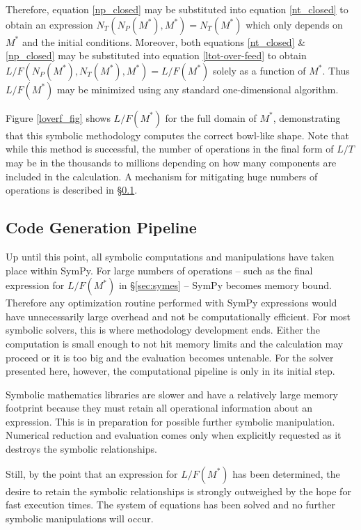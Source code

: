 \documentclass[preprint,12pt]{elsarticle}
\begin{document}
Therefore, equation \ref{np_closed} may be substituted into equation \ref{nt_closed}
to obtain an expression $N_T(N_P(M^*),M^*)=N_T(M^*)$ which only depends on $M^*$ and 
the initial conditions.  Moreover, both equations \ref{nt_closed} \& \ref{np_closed}
may be substituted into equation \ref{ltot-over-feed} to obtain 
$L/F(N_P(M^*),N_T(M^*),M^*)=L/F(M^*)$ solely as a function of $M^*$.  Thus
$L/F(M^*)$ may be minimized using any standard one-dimensional algorithm.

Figure \ref{loverf_fig} shows $L/F(M^*)$ for the full domain of $M^*$, demonstrating 
that this symbolic methodology computes the correct bowl-like shape.  Note that while 
this method is successful, the number of operations in the final form of $L/T$ may be 
in the thousands to millions depending on how many components are included in the 
calculation.  A mechanism for mitigating huge numbers of operations is described
in \S \ref{sec:codegen}.


\subsection{Code Generation Pipeline}
\label{sec:codegen}

Up until this point, all symbolic computations and manipulations have taken place
within SymPy.  For large numbers of operations -- such as the final expression for
$L/F(M^*)$ in \S\ref{sec:symes} -- SymPy becomes memory bound.  Therefore any 
optimization routine performed with SymPy expressions would have unnecessarily 
large overhead and 
not be computationally efficient.  For most symbolic solvers, this is where
methodology development ends.  Either the computation is small enough to not hit
memory limits and the calculation may proceed or it is too big and the evaluation
becomes untenable.  For the solver presented here, however, the computational 
pipeline is only in its initial step.

Symbolic mathematics libraries are slower and have a relatively large memory 
footprint because they must retain all operational information about an expression.
This is in preparation for possible further symbolic manipulation.  Numerical 
reduction and evaluation comes only when explicitly requested as it destroys the 
symbolic relationships.

Still, by the point that an expression for $L/F(M^*)$ has been determined, the 
desire to retain the symbolic relationships is strongly outweighed by the hope
for fast execution times.  The system of equations has been solved and no further
symbolic manipulations will occur.
\end{document}
